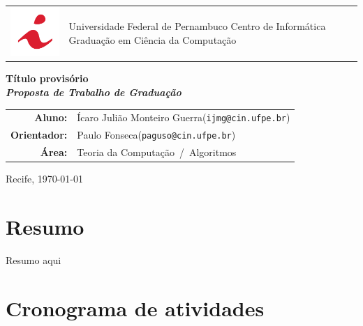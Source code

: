 \documentclass[12pt, a4paper, oneside]{article}
\makeatletter
\newcommand{\thetitle}{Título provisório}
\newcommand{\workarea}{Teoria da Computação~/~Algoritmos}
\newcommand{\major}{Ciência da Computação}
\newcommand{\studenttitle}{Aluno}
\newcommand{\student}{Ícaro Julião Monteiro Guerra}
\newcommand{\studentemail}{ijmg@cin.ufpe.br}
\newcommand{\advisertitle}{Orientador}
\newcommand{\adviser}{Paulo Fonseca}
\newcommand{\adviseremail}{paguso@cin.ufpe.br}
\makeatother
\begin{document}


{\Large
\thispagestyle{empty}
\begin{center}
\begin{tabular}{l p{10cm}}
	\includegraphics[width=3cm]{cin-logo.png} &
	\vspace{-25mm}
	Universidade Federal de Pernambuco\newline
	Centro de Informática\newline
	Graduação em \major
\end{tabular}

\vfill

{\huge \bfseries \thetitle}
\\
\medskip
{\bfseries\itshape Proposta de Trabalho de Graduação}

\vfill

\bigskip

	\begin{tabular}{r p{95mm}}
	\textbf{\studenttitle: } & \student \newline(\texttt{\studentemail}) \\ 
\textbf{\advisertitle: } & \adviser \newline(\texttt{\adviseremail})
\\
	\textbf{Área: } & \workarea 
\end{tabular}

	\vspace{3cm}
Recife, \today 
{}
\end{center}
}

\normalfont

\clearpage
\setcounter{page}{1}
\section*{Resumo}

Resumo aqui

\clearpage
\section*{Cronograma de atividades}
\end{document}
